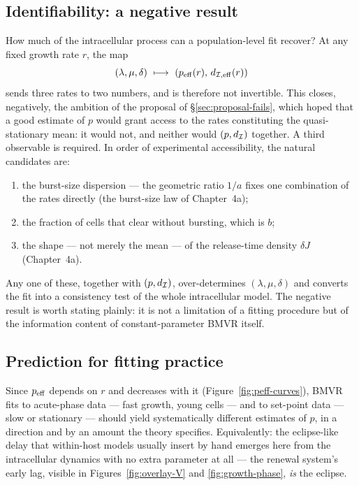 \subsection{Identifiability: a negative result}
\label{sec:identifiability}

How much of the intracellular process can a population-level fit recover?
At any fixed growth rate $r$, the map
\begin{equation}
(\lambda,\mu,\delta)\ \longmapsto\ \lrb{p_{\rm eff}(r),\,d_{\Icell,{\rm eff}}(r)}
\end{equation}
sends three rates to two numbers, and is therefore not invertible. This
closes, negatively, the ambition of the proposal of
\S\ref{sec:proposal-fails}, which hoped that a good estimate of $p$ would
grant access to the rates constituting the quasi-stationary mean: it would
not, and neither would $(p,d_{\mathcal{I}})$ together. A third observable is
required. In order of experimental accessibility, the natural candidates
are:
\begin{enumerate}
\item the burst-size dispersion --- the geometric ratio $1/a$ fixes one
combination of the rates directly (the burst-size law of Chapter~4a);
\item the fraction of cells that clear without bursting, which is $b$;
\item the shape --- not merely the mean --- of the release-time density
$\delta J$ (Chapter~4a).
\end{enumerate}
Any one of these, together with $(p,d_{\mathcal{I}})$, over-determines
$(\lambda,\mu,\delta)$ and converts the fit into a consistency test of the
whole intracellular model. The negative result is worth stating plainly: it
is not a limitation of a fitting procedure but of the information content
of constant-parameter BMVR itself.

\subsection{Prediction for fitting practice}

Since $p_{\rm eff}$ depends on $r$ and decreases with it
(Figure~\ref{fig:peff-curves}), BMVR fits to acute-phase data --- fast
growth, young cells --- and to set-point data --- slow or stationary ---
should yield systematically different estimates of $p$, in a direction and
by an amount the theory specifies. Equivalently: the eclipse-like delay
that within-host models usually insert by hand emerges here from the
intracellular dynamics with no extra parameter at all --- the renewal
system's early lag, visible in Figures~\ref{fig:overlay-V} and
\ref{fig:growth-phase}, \emph{is} the eclipse.
